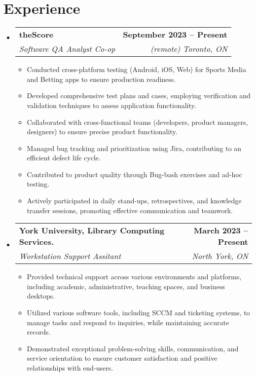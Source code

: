 \documentclass[letterpaper,11pt]{article}
\makeatletter
\newcommand{\resumeItem}[1]{
  \item\small{
    {#1 \vspace{-2pt}}
  }
}
\newcommand{\resumeSubheading}[4]{
  \vspace{-2pt}\item
    \begin{tabular*}{1.0\textwidth}[t]{l@{\extracolsep{\fill}}r}
      \textbf{#1} & \textbf{\small #2} \\
      \textit{\small#3} & \textit{\small #4} \\
    \end{tabular*}\vspace{-7pt}
}
\newcommand{\resumeSubHeadingListStart}{\begin{itemize}[leftmargin=0.0in, label={}]}
\newcommand{\resumeSubHeadingListEnd}{\end{itemize}}
\newcommand{\resumeItemListStart}{\begin{itemize}}
\newcommand{\resumeItemListEnd}{\end{itemize}\vspace{-5pt}}
\makeatother
\begin{document}
\section{Experience}
  \resumeSubHeadingListStart

    \resumeSubheading
      {theScore}{September 2023 -- Present}
      {Software QA Analyst Co-op}{(remote) Toronto, ON}
      \resumeItemListStart
        \resumeItem{Conducted cross-platform testing (Android, iOS, Web) for Sports Media and Betting apps to ensure production readiness.}
        \resumeItem{Developed comprehensive test plans and cases, employing verification and validation techniques to assess application functionality.}
        \resumeItem{Collaborated with cross-functional teams (developers, product managers, designers) to ensure precise product functionality.}
          \resumeItem{Managed bug tracking and prioritization using Jira, contributing to an efficient defect life cycle.}
           \resumeItem{Contributed to product quality through Bug-bash exercises and ad-hoc testing.}
            \resumeItem{
Actively participated in daily stand-ups, retrospectives, and knowledge transfer sessions, promoting effective communication and teamwork.}
            
    \resumeItemListEnd
    
    \resumeSubheading
      {York University, Library Computing Services.}{March 2023 -- Present}
      {Workstation Support Assitant}{North York, ON}
      \resumeItemListStart
              \resumeItem{Provided technical support across various environments and platforms, including academic, administrative, teaching spaces, and business desktops.}
        \resumeItem{Utilized various software tools, including SCCM and ticketing systems, to manage tasks and respond to inquiries, while maintaining accurate records.}
        \resumeItem{Demonstrated exceptional problem-solving skills, communication, and service orientation to ensure customer satisfaction and positive relationships with end-users.}
      \resumeItemListEnd

  \resumeSubHeadingListEnd
\vspace{-16pt}

\end{document}
